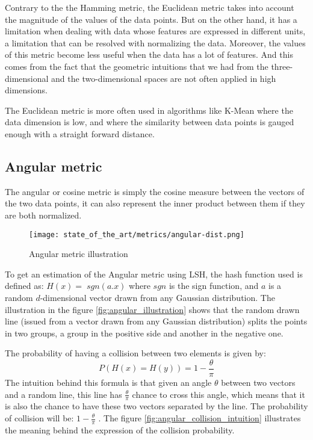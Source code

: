 Contrary to the the Hamming metric, the Euclidean metric takes into account the
magnitude of the values of the data points. But on the other hand, it has a
limitation when dealing with data whose features are expressed in different
units, a limitation that can be resolved with normalizing the data. Moreover,
the values of this metric become less useful when the data has a lot of
features. And this comes from the fact that the geometric intuitions that we had
from the three-dimensional and the two-dimensional spaces are not often applied
in high dimensions. \citep{domingos_few_2012}


The Euclidean metric is more often used in algorithms like K-Mean where the data
dimension is low, and where the similarity between data points is gauged enough
with a straight forward distance.

\subsection{Angular metric}
\label{subsect:angular_metric}
The angular or cosine metric is simply the cosine measure between
the vectors of the two data points, it can also represent the inner product
between them if they are both normalized.

\begin{figure}[h]
    \centering
    \texttt{[image: state\_of\_the\_art/metrics/angular-dist.png]}
    \caption{Angular metric illustration}
    \label{fig:angular_metric}
\end{figure}

To get an estimation of the Angular metric using LSH, the hash function used
is defined as: $H(x)=\;sgn(a.x)$ where $sgn$ is the sign function, and $a$ is a
random $d$-dimensional vector drawn from any Gaussian distribution. The
illustration in the figure
\ref{fig:angular_illustration}
shows that the random drawn line (issued from a vector drawn from any Gaussian
distribution) splits the points in two groups, a group in the positive side and
another in the negative one.

The probability of having a collision between two elements is given by:
$$
    P(H(x)=H(y))=1- \frac{\theta}{\pi}
$$
The intuition behind this formula is that given an angle $\theta$ between two
vectors and a random line, this line has $\frac{\theta}{\pi}$ chance to cross
this angle, which means that it is also the chance to have these two vectors
separated by the line. The probability of collision will be: $1 -
    \frac{\theta}{\pi}$ \citep{jafari_lsh_2017}. The figure
\ref{fig:angular_collision_intuition} illustrates the meaning behind the
expression of the collision probability.


